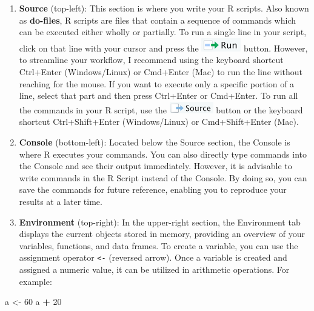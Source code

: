 \documentclass[
]{book}
\newenvironment{Shaded}{\begin{snugshade}}{\end{snugshade}}
\newcommand{\DecValTok}[1]{\textcolor[rgb]{0.00,0.00,0.81}{#1}}
\newcommand{\NormalTok}[1]{#1}
\newcommand{\OtherTok}[1]{\textcolor[rgb]{0.56,0.35,0.01}{#1}}
\newcommand{\SpecialCharTok}[1]{\textcolor[rgb]{0.81,0.36,0.00}{\textbf{#1}}}
\begin{document}
\begin{enumerate}
\def\labelenumi{\arabic{enumi}.}
\item
  \textbf{Source} (top-left): This section is where you write your R scripts. Also known as \textbf{do-files}, R scripts are files that contain a sequence of commands which can be executed either wholly or partially. To run a single line in your script, click on that line with your cursor and press the \includegraphics{files/icons-rstudio/run.png} button. However, to streamline your workflow, I recommend using the keyboard shortcut Ctrl+Enter (Windows/Linux) or Cmd+Enter (Mac) to run the line without reaching for the mouse. If you want to execute only a specific portion of a line, select that part and then press Ctrl+Enter or Cmd+Enter. To run all the commands in your R script, use the \includegraphics{files/icons-rstudio/source.png} button or the keyboard shortcut Ctrl+Shift+Enter (Windows/Linux) or Cmd+Shift+Enter (Mac).
\item
  \textbf{Console} (bottom-left): Located below the Source section, the Console is where R executes your commands. You can also directly type commands into the Console and see their output immediately. However, it is advisable to write commands in the R Script instead of the Console. By doing so, you can save the commands for future reference, enabling you to reproduce your results at a later time.
\item
  \textbf{Environment} (top-right): In the upper-right section, the Environment tab displays the current objects stored in memory, providing an overview of your variables, functions, and data frames. To create a variable, you can use the assignment operator \texttt{\textless{}-} (reversed arrow). Once a variable is created and assigned a numeric value, it can be utilized in arithmetic operations. For example:
\end{enumerate}

\begin{Shaded}
\begin{Highlighting}[]
\NormalTok{a }\OtherTok{\textless{}{-}} \DecValTok{60}
\NormalTok{a }\SpecialCharTok{+} \DecValTok{20}
\end{Highlighting}
\end{Shaded}
\end{document}
